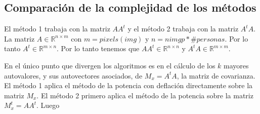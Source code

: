 \subsection{Comparación de la complejidad de los métodos}
El método 1 trabaja con la matriz $AA^t$ y el método 2 trabaja con la matriz $A^tA$.
La matriz $A\in\mathbb{R}^{n \times m}$ con $m = pixels(img)$ y $n = nimgp * \#personas$. Por lo tanto $A^t\in\mathbb{R}^{m \times n}$.
Por lo tanto tenemos que $AA^t\in\mathbb{R}^{n \times n}$ y $A^tA\in\mathbb{R}^{m \times m}$.

En el \'unico punto que divergen los algoritmos es en el c\'alculo de los $k$ mayores autovalores, y sus
autovectores asociados, de $M_x = A^tA$, la matriz de covarianza. 
El m\'etodo 1 aplica el m\'etodo de la potencia con deflaci\'on directamente sobre la matriz $M_x$. 
El m\'etodo 2 primero aplica el m\'etodo de la potencia sobre la matriz $M^t_x = AA^t$. Luego
